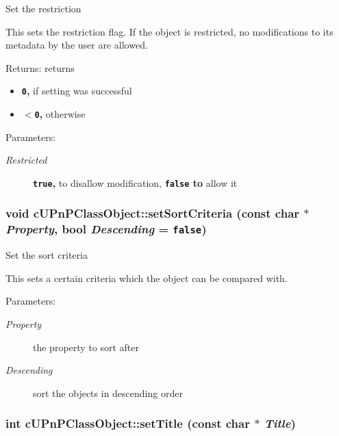 Set the restriction

This sets the restriction flag. If the object is restricted, no modifications to its metadata by the user are allowed.

\begin{Desc}
\item[Returns:]returns\begin{itemize}
\item {\bf {\tt 0},} if setting was successful\item {\bf {\tt $<$0},} otherwise \end{itemize}
\end{Desc}
\begin{Desc}
\item[Parameters:]
\begin{description}
\item[{\em Restricted}]{\bf {\tt true},} to disallow modification, {\bf {\tt false} to} allow it \end{description}
\end{Desc}
\hypertarget{classcUPnPClassObject_6bf77953db1fd098a0ec5bc8795e6c6b}{
\subsubsection[{setSortCriteria}]{\setlength{\rightskip}{0pt plus 5cm}void cUPnPClassObject::setSortCriteria (const char $\ast$ {\em Property}, \/  bool {\em Descending} = {\tt false})}}
\label{classcUPnPClassObject_6bf77953db1fd098a0ec5bc8795e6c6b}


Set the sort criteria

This sets a certain criteria which the object can be compared with.

\begin{Desc}
\item[Parameters:]
\begin{description}
\item[{\em Property}]the property to sort after \item[{\em Descending}]sort the objects in descending order \end{description}
\end{Desc}
\hypertarget{classcUPnPClassObject_717c3efc5b21fc0c92ef19f1925b24c5}{
\subsubsection[{setTitle}]{\setlength{\rightskip}{0pt plus 5cm}int cUPnPClassObject::setTitle (const char $\ast$ {\em Title})}}
\label{classcUPnPClassObject_717c3efc5b21fc0c92ef19f1925b24c5}



